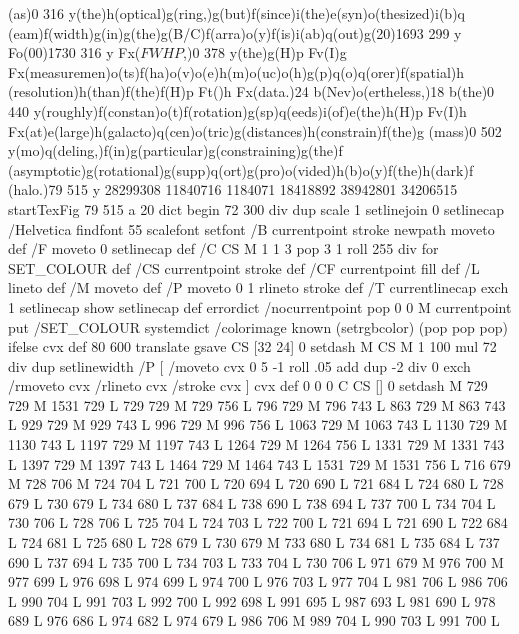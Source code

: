{{{{{{{{{{{{{{{{{{{{{{{{{{{{{{(as)0 316 y(the)h(optical)g(ring,)g(but)f(since)i(the)e(syn)o(thesized)i(b)q
(eam)f(width)g(in)g(the)g(B/C)f(arra)o(y)f(is)i(ab)q(out)g(20)1693
299 y Fo(00)1730 316 y Fx(\(FWHP\),)0 378 y(the)g(H)p Fv(I)g
Fx(measuremen)o(ts)f(ha)o(v)o(e)h(m)o(uc)o(h)g(p)q(o)q(orer)f(spatial)h
(resolution)h(than)f(the)f(H)p Ft()h Fx(data.)24 b(Nev)o(ertheless,)18
b(the)0 440 y(roughly)f(constan)o(t)f(rotation)g(sp)q(eeds)i(of)e(the)h(H)p
Fv(I)h Fx(at)e(large)h(galacto)q(cen)o(tric)g(distances)h(constrain)f(the)g
(mass)0 502 y(mo)q(deling,)f(in)g(particular)g(constraining)g(the)f
(asymptotic)g(rotational)g(supp)q(ort)g(pro)o(vided)h(b)o(y)f(the)h(dark)f
(halo.)79 515 y
 28299308 11840716 1184071 18418892 38942801 34206515 startTexFig
 79 515 a
 20 dict begin
72 300 div dup scale
1 setlinejoin 0 setlinecap
/Helvetica findfont 55 scalefont setfont 
/B { currentpoint stroke newpath moveto } def
/F { moveto 0 setlinecap} def
/C { CS M 1 1 3 { pop 3 1 roll 255 div } for SET_COLOUR } def
/CS { currentpoint stroke } def
/CF { currentpoint fill } def
/L { lineto } def /M { moveto } def
/P { moveto 0 1 rlineto stroke } def
/T { currentlinecap exch 1 setlinecap show setlinecap } def
errordict /nocurrentpoint { pop 0 0 M currentpoint } put
/SET_COLOUR systemdict /colorimage known
{ (setrgbcolor) } { (pop pop pop) } ifelse cvx def
 80 600 translate
gsave
CS [32 24] 0 setdash M
CS M 1 100 mul 72 div dup setlinewidth
/P [ /moveto cvx 0 5 -1 roll .05 add dup -2 div 0 exch /rmoveto cvx /rlineto cvx /stroke cvx ] cvx def
 0 0 0 C
CS [] 0 setdash M
729 729 M 1531 729 L
729 729 M 729 756 L
796 729 M 796 743 L
863 729 M 863 743 L
929 729 M 929 743 L
996 729 M 996 756 L
1063 729 M 1063 743 L
1130 729 M 1130 743 L
1197 729 M 1197 743 L
1264 729 M 1264 756 L
1331 729 M 1331 743 L
1397 729 M 1397 743 L
1464 729 M 1464 743 L
1531 729 M 1531 756 L
716 679 M 728 706 M 724 704 L
721 700 L
720 694 L
720 690 L
721 684 L
724 680 L
728 679 L
730 679 L
734 680 L
737 684 L
738 690 L
738 694 L
737 700 L
734 704 L
730 706 L
728 706 L
725 704 L
724 703 L
722 700 L
721 694 L
721 690 L
722 684 L
724 681 L
725 680 L
728 679 L
730 679 M 733 680 L
734 681 L
735 684 L
737 690 L
737 694 L
735 700 L
734 703 L
733 704 L
730 706 L
971 679 M 976 700 M 977 699 L
976 698 L
974 699 L
974 700 L
976 703 L
977 704 L
981 706 L
986 706 L
990 704 L
991 703 L
992 700 L
992 698 L
991 695 L
987 693 L
981 690 L
978 689 L
976 686 L
974 682 L
974 679 L
986 706 M 989 704 L
990 703 L
991 700 L
}}}}}}}}}}}}}}}}}}}}}}}}}}}}}}
